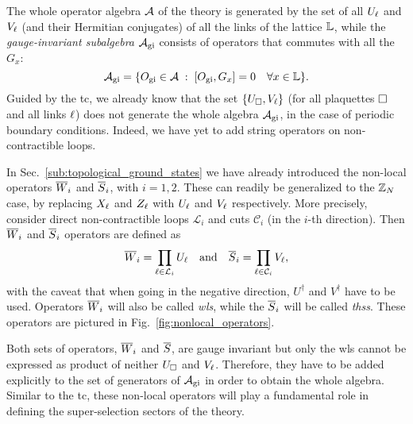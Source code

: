 \begin{figure}[t]
\end{figure}


The whole operator algebra $\mathcal{A}$ of the theory is generated by the set of all $U_\ell$ and $V_\ell$ (and their Hermitian conjugates) of all the links of the lattice $\mathbb{L}$, while the  \emph{gauge-invariant subalgebra} $\mathcal{A}_{\text{gi}}$ consists of operators that commutes with all the $G_x$:
\begin{equation}
    \mathcal{A}_{\text{gi}} = \{ O_{\text{gi}} \in \mathcal{A} \;:\; [O_{\text{gi}}, G_x] = 0 \quad \forall x \in \mathbb{L} \}.
\end{equation}
Guided by the \ac{tc}, we already know that the set $\{U_{\square}, V_\ell\}$ (for all plaquettes $\square$ and all links $\ell$) does not generate the whole algebra $\mathcal{A}_{\text{gi}}$, in the case of periodic boundary conditions.
Indeed, we have yet to add string operators on non-contractible loops.

In Sec.~\ref{sub:topological_ground_states} we have already introduced the non-local operators $\overline{W}_{i}$ and $\overline{S}_{i}$, with $i=1,2$.
These can readily be generalized to the $\mathbb{Z}_N$ case, by replacing $X_{\ell}$ and $Z_{\ell}$ with $U_{\ell}$ and $V_{\ell}$ respectively.
More precisely, consider direct non-contractible loops $\mathcal{L}_i$ and cuts $\mathcal{C}_i$ (in the $i$-th direction).
Then $\overline{W}_i$ and $\overline{S}_i$ operators are defined as
\begin{equation}
    \Wilson_i = \prod_{\link \in \mathcal{L}_i} U_\link
    \qand
    \tHooft_i = \prod_{\link \in \mathcal{C}_i} V_\link,
    \label{eq:nonlocal_op_ZN}
\end{equation}
with the caveat that when going in the negative direction, $U^{\dagger}$ and $V^{\dagger}$ have to be used.
Operators $\overline{W}_i$ will also be called \emph{\ac{wl}s}, while the $\overline{S}_i$ will be called \emph{\ac{ths}s}.
These operators are pictured in Fig.~\ref{fig:nonlocal_operators}.

Both sets of operators, $\overline{W}_i$ and $\overline{S}$, are gauge invariant but only the \ac{wl}s cannot be expressed as product of neither $U_{\square}$ and $V_{\ell}$.
Therefore, they have to be added explicitly to the set of generators of $\mathcal{A}_{\text{gi}}$ in order to obtain the whole algebra.
Similar to the \ac{tc}, these non-local operators will play a fundamental role in defining the super-selection sectors of the theory.

